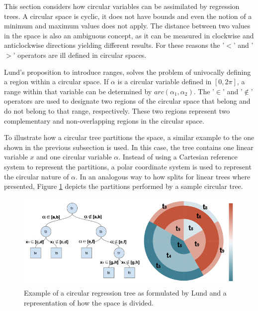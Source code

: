 \documentclass[times,twocolumn,final,authoryear]{elsarticle}
\begin{document}
This section considers how circular variables can be assimilated by regression trees. A circular space is cyclic, it does not have bounds and even the notion of a minimum and maximum values does not apply. The distance between two values in the space is also an ambiguous concept, as it can be measured in clockwise and anticlockwise directions yielding different results. For these reasons the '$<$' and '$>$' operators are ill defined in circular spaces.

Lund's proposition to introduce ranges, solves the problem of univocally defining a region within a circular space. If $\alpha$ is a circular variable defined in $[0, 2\pi]$, a range within that variable can be determined by $arc(\alpha_1, \alpha_2)$. The '$\in$' and '$\notin$' operators are used to designate two regions of the circular space that belong and do not belong to that range, respectively. These two regions represent two complementary and non-overlapping regions in the circular space.

To illustrate how a circular tree partitions the space, a similar example to the one shown in the previous subsection is used. In this case, the tree contains one linear variable $x$ and one circular variable $\alpha$. Instead of using a Cartesian reference system to represent the partitions, a polar coordinate system is used to represent the circular nature of $\alpha$. In an analogous way to how splits for linear trees where presented, Figure \ref{f3} depicts the partitions performed by a sample circular tree.

%
\begin{figure}
  \includegraphics[width=17cm]{fig3_master.png}
\caption{Example of a circular regression tree as formulated by Lund and a representation of how the space is divided.}
\label{f3}       %
\end{figure}
%
\end{document}
